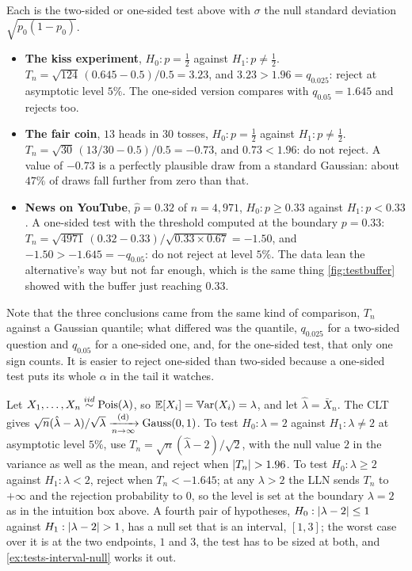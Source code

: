 \begin{worked}
Each is the two-sided or one-sided test above with $\sigma$ the null standard deviation $\sqrt{p_0(1 - p_0)}$.
\begin{itemize}
\item \textbf{The kiss experiment}, $H_0: p = \frac12$ against $H_1: p \neq \frac12$.
$T_n = \sqrt{124}\,(0.645 - 0.5)/0.5 = 3.23$, and $3.23 > 1.96 = q_{0.025}$: reject at asymptotic level $5\%$.
The one-sided version compares with $q_{0.05} = 1.645$ and rejects too.
\item \textbf{The fair coin}, $13$ heads in $30$ tosses, $H_0: p = \frac12$ against $H_1: p \neq \frac12$.
$T_n = \sqrt{30}\,(13/30 - 0.5)/0.5 = -0.73$, and $0.73 < 1.96$: do not reject.
A value of $-0.73$ is a perfectly plausible draw from a standard Gaussian: about $47\%$ of draws fall further from zero than that.
\item \textbf{News on YouTube}, $\hat{p} = 0.32$ of $n = 4{,}971$, $H_0: p \geq 0.33$ against $H_1: p < 0.33$.
A one-sided test with the threshold computed at the boundary $p = 0.33$: $T_n = \sqrt{4971}\,(0.32 - 0.33)/\sqrt{0.33 \times 0.67} = -1.50$, and $-1.50 > -1.645 = -q_{0.05}$: do not reject at level $5\%$.
The data lean the alternative's way but not far enough, which is the same thing \cref{fig:testbuffer} showed with the buffer just reaching $0.33$.
\end{itemize}
Note that the three conclusions came from the same kind of comparison, $T_n$ against a Gaussian quantile; what differed was the quantile, $q_{0.025}$ for a two-sided question and $q_{0.05}$ for a one-sided one, and, for the one-sided test, that only one sign counts.
It is easier to reject one-sided than two-sided because a one-sided test puts its whole $\alpha$ in the tail it watches.
\end{worked}

\begin{example}
\label{ex:tests-poisson}
Let $X_1, \ldots, X_n \stackrel{iid}{\sim} \text{Pois}(\lambda)$, so $\operatorname*{\mathbb{E}}[X_i] = \operatorname*{\mathbb{V}\text{ar}}(X_i) = \lambda$, and let $\hat{\lambda} = \bar{X}_n$.
The CLT gives $\sqrt{n}(\hat{\lambda} - \lambda)/\sqrt{\lambda} \xrightarrow [n \to \infty ]{\text{(d)}} \text{Gauss}(0,1)$.
To test $H_0: \lambda = 2$ against $H_1: \lambda \neq 2$ at asymptotic level $5\%$, use $T_n = \sqrt{n}(\hat{\lambda} - 2)/\sqrt{2}$, with the null value $2$ in the variance as well as the mean, and reject when $\lvert T_n\rvert > 1.96$.
To test $H_0: \lambda \geq 2$ against $H_1: \lambda < 2$, reject when $T_n < -1.645$; at any $\lambda > 2$ the LLN sends $T_n$ to $+\infty$ and the rejection probability to $0$, so the level is set at the boundary $\lambda = 2$ as in the intuition box above.
A fourth pair of hypotheses, $H_0: \lvert\lambda - 2\rvert \leq 1$ against $H_1: \lvert\lambda - 2\rvert > 1$, has a null set that is an interval, $[1, 3]$; the worst case over it is at the two endpoints, $1$ and $3$, the test has to be sized at both, and \cref{ex:tests-interval-null} works it out.
\end{example}

